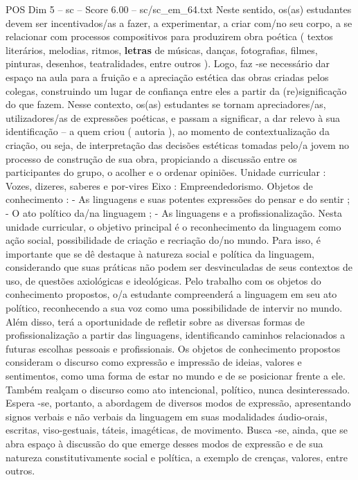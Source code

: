 \begin{textsample}{POS Dim 5 – sc – Score 6.00 – sc/sc\_em\_64.txt}
Neste sentido, os(as) estudantes devem ser incentivados/as a fazer, a experimentar, a criar com/no seu corpo, a se relacionar com processos compositivos para produzirem obra poética ( textos literários, melodias, ritmos, \textbf{letras} de músicas, danças, fotografias, filmes, pinturas, desenhos, teatralidades, entre outros ).
Logo, faz -se necessário dar espaço na aula para a fruição e a apreciação estética das obras criadas pelos colegas, construindo um lugar de confiança entre eles a partir da (re)significação do que fazem.
Nesse contexto, os(as) estudantes se tornam apreciadores/as, utilizadores/as de expressões poéticas, e passam a significar, a dar relevo à sua identificação – a quem criou ( autoria ), ao momento de contextualização da criação, ou seja, de interpretação das decisões estéticas tomadas pelo/a jovem no processo de construção de sua obra, propiciando a discussão entre os participantes do grupo, o acolher e o ordenar opiniões.
Unidade curricular : Vozes, dizeres, saberes e por-vires Eixo : Empreendedorismo.
Objetos de conhecimento : - As linguagens e suas potentes expressões do pensar e do sentir ; - O ato político da/na linguagem ; - As linguagens e a profissionalização.
Nesta unidade curricular, o objetivo principal é o reconhecimento da linguagem como ação social, possibilidade de criação e recriação do/no mundo.
Para isso, é importante que se dê destaque à natureza social e política da linguagem, considerando que suas práticas não podem ser desvinculadas de seus contextos de uso, de questões axiológicas e ideológicas.
Pelo trabalho com os objetos do conhecimento propostos, o/a estudante compreenderá a linguagem em seu ato político, reconhecendo a sua voz como uma possibilidade de intervir no mundo.
Além disso, terá a oportunidade de refletir sobre as diversas formas de profissionalização a partir das linguagens, identificando caminhos relacionados a futuras escolhas pessoais e profissionais.
Os objetos de conhecimento propostos consideram o discurso como expressão e impressão de ideias, valores e sentimentos, como uma forma de estar no mundo e de se posicionar frente a ele.
Também realçam o discurso como ato intencional, político, nunca desinteressado.
Espera -se, portanto, a abordagem de diversos modos de expressão, apresentando signos verbais e não verbais da linguagem em suas modalidades áudio-orais, escritas, viso-gestuais, táteis, imagéticas, de movimento.
Busca -se, ainda, que se abra espaço à discussão do que emerge desses modos de expressão e de sua natureza constitutivamente social e política, a exemplo de crenças, valores, entre outros.

\end{textsample}

